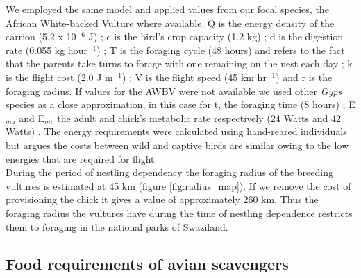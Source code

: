 We employed the same model and applied values from our focal species, the African White-backed Vulture where available. Q is the energy density of the carrion (5.2 x 10$^{-6}$ J) \citep{ruxton2002modelling}; c is the bird's crop capacity (1.2 kg) \citep{houston1975digestive}; d is the digestion rate (0.055 kg hour$^{-1}$) \citep{ruxton2002modelling}; T is the foraging cycle (48 hours) and refers to the fact that the parents take turns to forage with one remaining on the nest each day \citep{mundy1992vultures}; k is the flight cost (2.0 J m$^{-1}$) \citep{pennycuick1972soaring}; V is the flight speed (45 km hr$^{-1}$) \citep{pennycuick1972soaring,tucker1988gliding} and r is the foraging radius. If values for the AWBV were not available we used other \textit{Gyps} species as a close approximation, in this case for t, the foraging time (8 hours) \citep{xirouchakis2007seasonal}; E$_{ma}$ and E$_{mc}$ the adult and chick's metabolic rate respectively (24 Watts and 42 Watts) \citep{sinclair1995serengeti,houston1976breeding}. The energy requirements were calculated using hand-reared individuals but \cite{houston1976breeding} argues the costs between wild and captive birds are similar owing to the low energies that are required for flight. \\
\indent
During the period of nestling dependency the foraging radius of the breeding vultures is estimated at 45 km (figure \ref{fig:radius_map}). If we remove the cost of provisioning the chick it gives a value of approximately 260 km. Thus the foraging radius the vultures have during the time of nestling dependence restricts them to foraging in the national parks of Swaziland.


\subsection{Food requirements of avian scavengers}

